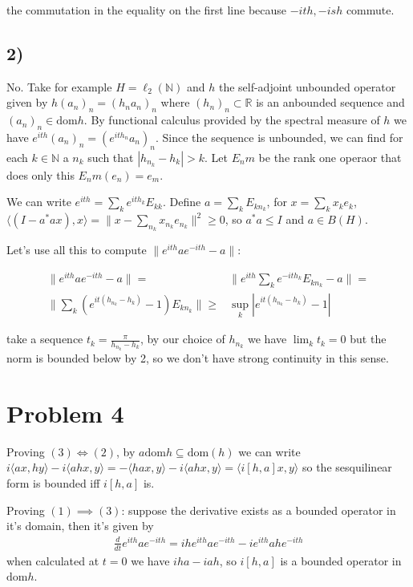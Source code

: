 \documentclass{article}
\begin{document}
the commutation in the equality on the first line because $-ith,-ish$ commute.


\subsection*{2)}


No. Take for example $H=\ell_2(\mathbb{N})$ and $h$ the self-adjoint unbounded
operator given by $h(a_n)_n=(h_n a_n)_n$ where $(h_n)_n\subset \mathbb{R}$
is an anbounded sequence and $(a_n)_n\in \text{dom} h$.
By functional calculus provided by the spectral measure of $h$ we have 
$e^{ith}(a_n)_n=(e^{ith_n}a_n)_n$. Since the sequence is unbounded, we can find
for each $k\in \mathbb{N}$ a $n_k$ such that $|h_{n_k}-h_k|>k$. Let $E_nm$ be 
the rank one operaor that does only this $E_nm (e_n)=e_m$. 

We can write $e^{ith}=\sum_{k}e^{ith_k}E_{kk}$.  Define $a=\sum_k E_{k n_k}$,
for $x=\sum_k x_k e_k$, $\langle (I-a^\ast a x),x\rangle =\|x-\sum_{n_k} x_{n_k}e_{n_k}\|^2 \geq 0 $,
so $a^\ast a \leq I$ and $a\in B(H)$. 

Let's use all this to compute $\| e^{ith}ae^{-ith}-a      \|$:

\begin{align*}
    \| e^{ith}ae^{-ith}-a      \|=&\|e^{ith}\sum _k e^{-ith_k}E_{k n_k}-a  \|=\\
    \|\sum_k (e^{it(h_{n_k}-h_k)}-1)E_{k n_k} \|\geq & \sup_k |e^{it(h_{n_k}-h_k)}-1|
\end{align*}

take a sequence $t_k=\frac{\pi}{h_{n_k}-h_k}$, by our choice of $h_{n_k}$ 
we have $\lim_k t_k=0$ but the norm is bounded below by 2, so we don't have
strong continuity in this sense.





\section*{Problem 4}

Proving $(3)\iff (2)$, by $a\text{dom} h\subseteq \text{dom}(h) $ we can write 
$i\langle ax, hy\rangle-i\langle ahx, y\rangle=-\langle hax,y\rangle 
-i\langle ahx,y\rangle =\langle i[h,a]x,y\rangle$ so the sesquilinear form
is bounded iff $i[h,a]$ is.

Proving $(1)\implies (3)$:
suppose the derivative exists as a bounded operator in it's domain, then 
it's given by 
\begin{align}
    \frac{d}{dt} e^{ith}ae^{-ith}=ihe^{ith}ae^{-ith}-ie^{ith}ahe^{-ith}
\end{align}
when calculated at $t=0$ we have $iha-iah$, so $i[h,a]$ is a bounded operator 
in $\text{dom} h$.
\end{document}
